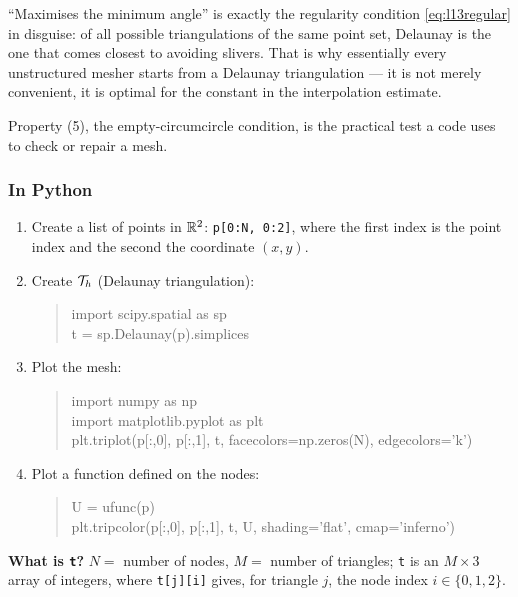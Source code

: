 \begin{mechanics}
``Maximises the minimum angle'' is exactly the regularity condition
\eqref{eq:l13regular} in disguise: of all possible triangulations of the same
point set, Delaunay is the one that comes closest to avoiding slivers. That is
why essentially every unstructured mesher starts from a Delaunay triangulation
--- it is not merely convenient, it is optimal for the constant in the
interpolation estimate.

Property (5), the empty-circumcircle condition, is the practical test a code
uses to check or repair a mesh.
\end{mechanics}

\subsubsection*{In Python}

\begin{enumerate}[label=\arabic*),leftmargin=2.2em,itemsep=3pt]
\item Create a list of points in $\mathbb{R}^{2}$: \texttt{p[0:N, 0:2]}, where the
  first index is the point index and the second the coordinate $(x,y)$.
\item Create $\mathcal{T}_{h}$ (Delaunay triangulation):
\begin{quote}\ttfamily
import scipy.spatial as sp\\
t = sp.Delaunay(p).simplices
\end{quote}
\item Plot the mesh:
\begin{quote}\ttfamily
import numpy as np\\
import matplotlib.pyplot as plt\\
plt.triplot(p[:,0], p[:,1], t, facecolors=np.zeros(N), edgecolors='k')
\end{quote}
\item Plot a function defined on the nodes:
\begin{quote}\ttfamily
U = ufunc(p)\\
plt.tripcolor(p[:,0], p[:,1], t, U, shading='flat', cmap='inferno')
\end{quote}
\end{enumerate}

\noindent
\textbf{What is \texttt{t}?} $N=$ number of nodes, $M=$ number of triangles;
\texttt{t} is an $M\times3$ array of integers, where \texttt{t[j][i]} gives, for
triangle $j$, the node index $i\in\{0,1,2\}$.

